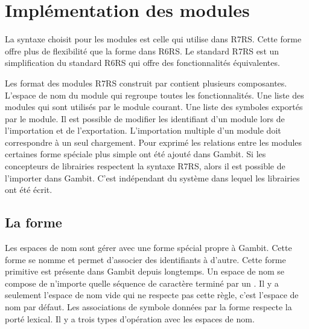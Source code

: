 
\chapter{Implémentation des modules}

La syntaxe choisit pour les modules est celle qui utilise 
dans R7RS. Cette forme offre plus de flexibilité que la forme  dans
R6RS. Le standard R7RS est un simplification du standard R6RS qui offre des
fonctionnalités équivalentes.

Les format des modules R7RS construit par  contient
plusieurs composantes. L'espace de nom du module qui regroupe toutes les
fonctionnalités. Une liste des modules qui sont utilisés par le module courant.
Une liste des symboles exportés par le module. Il est possible de modifier les
identifiant d'un module lors de l'importation et de l'exportation.
L'importation multiple d'un module doit correspondre à un seul chargement.
Pour exprimé les relations entre les modules certaines forme spéciale plus
simple ont été ajouté dans Gambit.  Si les concepteurs de librairies respectent
la syntaxe R7RS, alors il est possible de l'importer dans Gambit. C'est indépendant
du système dans lequel les librairies ont été écrit.





\section{La forme }

Les espaces de nom sont gérer avec une forme spécial propre à Gambit. Cette
forme se nomme  et permet d'associer des identifiants à
d'autre.  Cette forme primitive est présente dans Gambit depuis longtemps.  Un
espace de nom se compose de n'importe quelle séquence de caractère terminé par
un \lstcode{#}. Il y a seulement l'espace de nom vide qui ne respecte pas cette
règle, c'est l'espace de nom par défaut.  Les associations de symbole données
par la forme  respecte la porté lexical. Il y a trois
types d'opération avec les espaces de nom.

